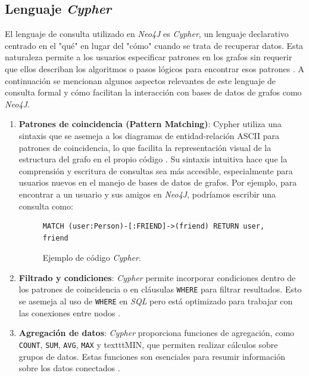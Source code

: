 \subsection{Lenguaje \textit{Cypher}} \label{cypher_language}

El lenguaje de consulta utilizado en \textit{Neo4J} es \textit{Cypher}, un lenguaje declarativo centrado en el "qué" en lugar del "cómo" cuando se trata de recuperar datos. Esta naturaleza permite a los usuarios especificar patrones en los grafos sin requerir que ellos describan los algoritmos o pasos lógicos para encontrar esos patrones \cite{neo4jdocs2022}. A continuación se mencionan algunos aspectos relevantes de este lenguaje de consulta formal y cómo facilitan la interacción con bases de datos de grafos como \textit{Neo4J}.

\begin{enumerate}

\item \textbf{Patrones de coincidencia (Pattern Matching)}:
Cypher utiliza una sintaxis que se asemeja a los diagramas de entidad-relación ASCII para patrones de coincidencia, lo que facilita la representación visual de la estructura del grafo en el propio código \cite{rodriguez2015}. Su sintaxis intuitiva hace que la comprensión y escritura de consultas sea más accesible, especialmente para usuarios nuevos en el manejo de bases de datos de grafos. Por ejemplo, para encontrar a un usuario y sus amigos en \textit{Neo4J}, podríamos escribir una consulta como:

\begin{figure}[h]
\begin{center}
\begin{lstlisting}[language=cypher]
MATCH (user:Person)-[:FRIEND]->(friend) RETURN user, friend
\end{lstlisting}
\caption{Ejemplo de código \textit{Cypher}.}
\end{center}
\end{figure}

\item \textbf{Filtrado y condiciones}: \textit{Cypher} permite incorporar condiciones dentro de los patrones de coincidencia o en cláusulas \texttt{WHERE} para filtrar resultados. Esto se asemeja al uso de \texttt{WHERE} en \textit{SQL} pero está optimizado para trabajar con las conexiones entre nodos \cite{webber2012}.

\item \textbf{Agregación de datos}: \textit{Cypher} proporciona funciones de agregación, como \texttt{COUNT}, \texttt{SUM}, \texttt{AVG}, \texttt{MAX} y texttt{MIN}, que permiten realizar cálculos sobre grupos de datos. Estas funciones son esenciales para resumir información sobre los datos conectados \cite{neo4jdocs2022}.


\end{enumerate}
